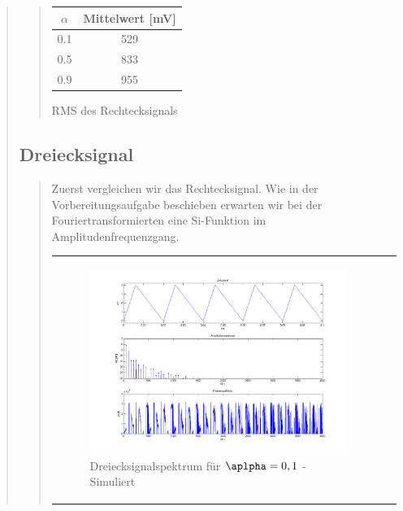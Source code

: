 \begin{quote}
\begin{quote}
            \begin{center}
                  \begin{tabular}{|c|c|}
                  \hline
                   $\alpha $ &  Mittelwert [mV] \\ \hline 
                   0.1 &  529 \\ \hline
                   0.5 &  833 \\ \hline
                   0.9 &  955 \\ \hline           
                 \end{tabular}
                       \caption{RMS des Rechtecksignals}
                        \label{tablelabel1}
            
            \end{center}
        
    \end{quote}
    
    \subsection{Dreiecksignal}
    \begin{quote}
        Zuerst vergleichen wir das Rechtecksignal. Wie in der Vorbereitungsaufgabe beschieben erwarten wir bei der
        Fouriertransformierten eine Si-Funktion im Amplitudenfrequenzgang.

            \begin{center}
            \begin{tabular}{ll}

            \hspace{-12em}
                \begin{minipage}{0.6\textwidth}

                    \begin{figure}[H]
                        \label{fig:}            
                        \includegraphics[scale=0.25]{./Bilder/drei_alpha1.png} %
                        \caption{Dreiecksignalspektrum für $\aplpha = 0,1$ - Simuliert}
                    \end{figure}


\end{minipage}
\end{tabular}
\end{center}
\end{quote}
\end{quote}
